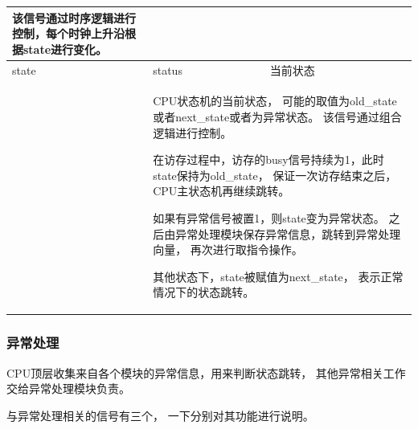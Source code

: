 \begin{tabularx}{\textwidth}{lll}
{                    该信号通过时序逻辑进行控制，每个时钟上升沿根据state进行变化。
                } \\
                \midrule
                state             & status        & 当前状态 \\
                \cmidrule(l){2-3}
                &
                \multicolumn{2}{X}{
                    CPU状态机的当前状态，%
                    可能的取值为old\_state或者next\_state或者为异常状态。%
                    该信号通过组合逻辑进行控制。

                    在访存过程中，访存的busy信号持续为1，此时state保持为old\_state，%
                    保证一次访存结束之后，CPU主状态机再继续跳转。

                    如果有异常信号被置1，则state变为异常状态。%
                    之后由异常处理模块保存异常信息，跳转到异常处理向量，%
                    再次进行取指令操作。

                    其他状态下，state被赋值为next\_state，%
                    表示正常情况下的状态跳转。
                } \\
                \bottomrule
            \end{tabularx}

        \subsubsection{异常处理}
            CPU顶层收集来自各个模块的异常信息，用来判断状态跳转，%
            其他异常相关工作交给异常处理模块负责。

            与异常处理相关的信号有三个，%
            一下分别对其功能进行说明。


